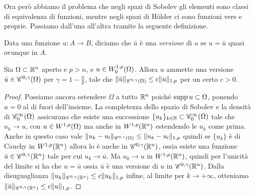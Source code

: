 Ora però abbiamo il problema che negli spazi di Sobolev gli elementi sono classi di equivalenza di funzioni, mentre negli spazi di Hölder ci sono funzioni vere e proprie.
Passiamo dall'una all'altra tramite la seguente definizione.
\begin{definizione} \label{d:versione}
    Data una funzione $u\colon A\to B$, diciamo che $\bar{u}$ è una \emph{versione} di $u$ se $u=\bar{u}$ quasi ovunque in $A$.
\end{definizione}
\begin{teorema} \label{t:versione-holder-continua}
    Sia $\Omega\subset\R^n$ aperto e $p>n$, e $u\in\sobWc[1,p]{\Omega}$.
    Allora $u$ ammette una versione $\bar{u}\in\cont[0,\gamma]{\Omega}$ per $\gamma=1-\frac{n}{p}$, tale che $\norm{\bar{u}}_{\cont[0,\gamma]{\Omega}}\le c\norm{u}_{1,p}$ per un certo $c>0$.
\end{teorema}
\begin{proof}
   Possiamo ancora estendere $\Omega$ a tutto $\R^n$ poich\'e $\supp u\subset\Omega$, ponendo $u=0$ al di fuori dell'insieme.
   La completezza dello spazio di Sobolev e la densità di $\contsc[\infty]{\Omega}$ assicurano che esiste una successione $\{u_k\}_{k\in\N}\subset\contsc[\infty]{\Omega}$ tale che $u_k\to u$, con $u\in\sobW[1,p]{\Omega}$ ma anche in $\sobW[1,p]{\R^n}$ estendendo le $u_k$ come prima.
   Anche in questo caso vale $\norm{u_k-u_l}_{\cont[0,\gamma]{\Omega}}\le\norm{u_k-u_l}_{1,p}$ quindi se $\{u_k\}$ è di Cauchy in $\sobW[1,p]{\R^n}$ allora lo è anche in $\cont[0,\gamma]{\R^n}$, ossia esiste una funzione $\bar{u}\in\cont[0,\gamma]{\R^n}$ tale per cui $u_k\to\bar{u}$.
   Ma $u_k\to u$ in $\sobW[1,p]{\R^n}$, quindi per l'unicità del limite si ha che $u=\bar{u}$ ossia $\bar{u}$ è una versione di $u$ in $\cont[0,\gamma]{\R^n}$.
   Dalla disuguaglianza $\norm{u_k}_{\cont[0,\gamma]{\R^n}}\le c\norm{u_k}_{1,p}$ infine, al limite per $k\to+\infty$, otteniamo $\norm{\bar{u}}_{\cont[0,\gamma]{\R^n}}\le c\norm{u}_{1,p}$.
\end{proof}

